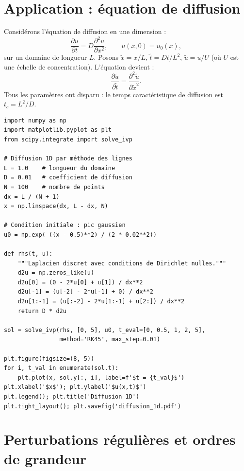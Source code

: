 \section{Application : \'equation de diffusion}
\label{sec:diffusion_dim}

Consid\'erons l'\'equation de diffusion en une dimension :
\[
  \frac{\partial u}{\partial t} = D\frac{\partial^2 u}{\partial x^2},
  \qquad u(x,0) = u_0(x),
\]
sur un domaine de longueur $L$.  Posons $\tilde{x}=x/L$,
$\tilde{t}=Dt/L^2$, $\tilde{u}=u/U$ (o\`u $U$ est une \'echelle
de concentration).  L'\'equation devient :
\[
  \frac{\partial\tilde{u}}{\partial\tilde{t}}
  = \frac{\partial^2\tilde{u}}{\partial\tilde{x}^2}.
\]
Tous les param\`etres ont disparu : le temps caract\'eristique
de diffusion est $t_c = L^2/D$.

\begin{codeblock}[title=\textbf{Temps de diffusion en Python}]
\begin{verbatim}
import numpy as np
import matplotlib.pyplot as plt
from scipy.integrate import solve_ivp

# Diffusion 1D par méthode des lignes
L = 1.0    # longueur du domaine
D = 0.01   # coefficient de diffusion
N = 100    # nombre de points
dx = L / (N + 1)
x = np.linspace(dx, L - dx, N)

# Condition initiale : pic gaussien
u0 = np.exp(-((x - 0.5)**2) / (2 * 0.02**2))

def rhs(t, u):
    """Laplacien discret avec conditions de Dirichlet nulles."""
    d2u = np.zeros_like(u)
    d2u[0] = (0 - 2*u[0] + u[1]) / dx**2
    d2u[-1] = (u[-2] - 2*u[-1] + 0) / dx**2
    d2u[1:-1] = (u[:-2] - 2*u[1:-1] + u[2:]) / dx**2
    return D * d2u

sol = solve_ivp(rhs, [0, 5], u0, t_eval=[0, 0.5, 1, 2, 5],
                method='RK45', max_step=0.01)

plt.figure(figsize=(8, 5))
for i, t_val in enumerate(sol.t):
    plt.plot(x, sol.y[:, i], label=f'$t = {t_val}$')
plt.xlabel('$x$'); plt.ylabel('$u(x,t)$')
plt.legend(); plt.title('Diffusion 1D')
plt.tight_layout(); plt.savefig('diffusion_1d.pdf')
\end{verbatim}
\end{codeblock}

\section{Perturbations r\'eguli\`eres et ordres de grandeur}
\label{sec:perturbations}

